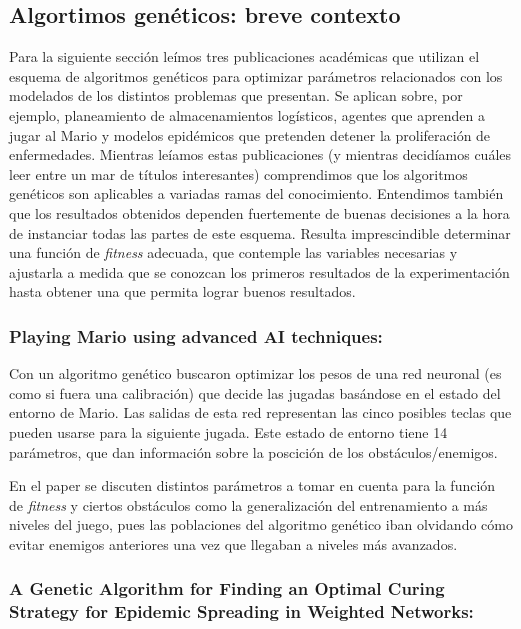 \subsection{Algortimos genéticos: breve contexto}

Para la siguiente sección leímos tres publicaciones académicas que utilizan el esquema de algoritmos genéticos para optimizar parámetros relacionados con los modelados de los distintos problemas que presentan. Se aplican sobre, por ejemplo, planeamiento de almacenamientos logísticos\cite{warehouse}, agentes que aprenden a jugar al Mario\cite{mario} y modelos epidémicos que pretenden detener la proliferación de enfermedades\cite{epidemic}. Mientras leíamos estas publicaciones (y mientras decidíamos cuáles leer entre un mar de títulos interesantes) comprendimos que los algoritmos genéticos son aplicables a variadas ramas del conocimiento. Entendimos también que los resultados obtenidos dependen fuertemente de buenas decisiones a la hora de instanciar todas las partes de este esquema. Resulta imprescindible determinar una función de \emph{fitness} adecuada, que contemple las variables necesarias y ajustarla a medida que se conozcan los primeros resultados de la experimentación hasta obtener una que permita lograr buenos resultados.


\subsubsection*{Playing Mario using advanced AI techniques:}

Con un algoritmo genético buscaron optimizar los pesos de una red neuronal (es como si fuera una calibración) que decide las
jugadas basándose en el estado del entorno de Mario. Las salidas de esta red representan las cinco posibles teclas que pueden
usarse para la siguiente jugada.
Este estado de entorno tiene 14 parámetros, que dan información sobre la poscición de los obstáculos/enemigos.


En el paper se discuten distintos parámetros a tomar en cuenta para la función de \emph{fitness} y ciertos obstáculos como
la generalización del entrenamiento a más niveles del juego, pues las poblaciones del algoritmo genético iban olvidando cómo
 evitar enemigos anteriores una vez que llegaban a niveles más avanzados.

\subsubsection*{A Genetic Algorithm for Finding an Optimal Curing Strategy for Epidemic Spreading in Weighted Networks:}

